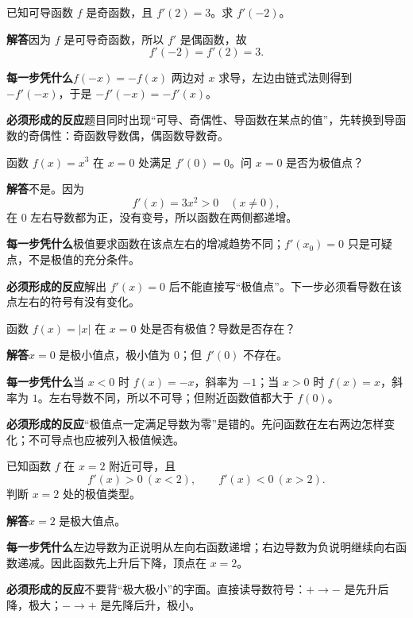 \documentclass[11pt,fontset=fandol]{ctexart}
\newcommand{\answer}{\par\textbf{解答}\quad}
\newcommand{\basis}{\par\textbf{每一步凭什么}\quad}
\newcommand{\reaction}{\par\textbf{必须形成的反应}\quad}
\newenvironment{drill}[2]{
  \begin{tcolorbox}[colback=white,colframe=black!35,title={#1\quad\small #2},breakable]
}{\end{tcolorbox}}
\begin{document}
\begin{drill}{17. 可导奇函数的导函数是偶函数}{人教B版导数与函数性质题型改编}
已知可导函数 $f$ 是奇函数，且 $f'(2)=3$。求 $f'(-2)$。

\answer 因为 $f$ 是可导奇函数，所以 $f'$ 是偶函数，故
\[
f'(-2)=f'(2)=3.
\]

\basis $f(-x)=-f(x)$ 两边对 $x$ 求导，左边由链式法则得到 $-f'(-x)$，于是 $-f'(-x)=-f'(x)$。

\reaction 题目同时出现“可导、奇偶性、导函数在某点的值”，先转换到导函数的奇偶性：奇函数导数偶，偶函数导数奇。
\end{drill}

\begin{drill}{18. 导数为零并不自动等于极值}{甲种本《微积分初步》极值章节例题改编}
函数 $f(x)=x^3$ 在 $x=0$ 处满足 $f'(0)=0$。问 $x=0$ 是否为极值点？

\answer 不是。因为
\[
f'(x)=3x^2>0\quad(x\ne0),
\]
在 $0$ 左右导数都为正，没有变号，所以函数在两侧都递增。

\basis 极值要求函数在该点左右的增减趋势不同；$f'(x_0)=0$ 只是可疑点，不是极值的充分条件。

\reaction 解出 $f'(x)=0$ 后不能直接写“极值点”。下一步必须看导数在该点左右的符号有没有变化。
\end{drill}

\begin{drill}{19. 导数不存在也可能是极值点}{甲种本《微积分初步》可导性章节例题改编}
函数 $f(x)=|x|$ 在 $x=0$ 处是否有极值？导数是否存在？

\answer $x=0$ 是极小值点，极小值为 $0$；但 $f'(0)$ 不存在。

\basis 当 $x<0$ 时 $f(x)=-x$，斜率为 $-1$；当 $x>0$ 时 $f(x)=x$，斜率为 $1$。左右导数不同，所以不可导；但附近函数值都大于 $f(0)$。

\reaction “极值点一定满足导数为零”是错的。先问函数在左右两边怎样变化；不可导点也应被列入极值候选。
\end{drill}

\begin{drill}{20. 导数从正到负是极大值}{甲种本《微积分初步》极值章节改编}
已知函数 $f$ 在 $x=2$ 附近可导，且
\[
f'(x)>0\ (x<2),\qquad f'(x)<0\ (x>2).
\]
判断 $x=2$ 处的极值类型。

\answer $x=2$ 是极大值点。

\basis 左边导数为正说明从左向右函数递增；右边导数为负说明继续向右函数递减。因此函数先上升后下降，顶点在 $x=2$。

\reaction 不要背“极大极小”的字面。直接读导数符号：$+\to-$ 是先升后降，极大；$-\to+$ 是先降后升，极小。
\end{drill}
\end{document}
